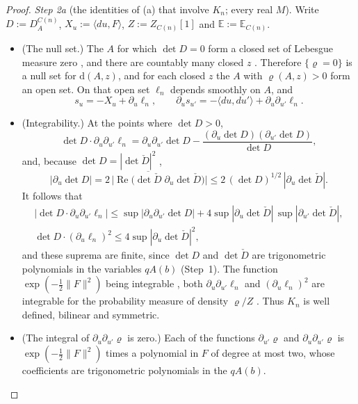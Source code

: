 \documentclass[11pt]{amsart}
\theoremstyle{definition}
\begin{document}
\begin{proof}
\emph{Step 2a} (the identities of (a) that involve $K_n$; every real $M$).
Write $D:=D^{C(n)}_A$, $X_u:=\langle du,F\rangle$, $Z:=Z_{C(n)}[1]$ and $\mathbb E:=\mathbb E_{C(n)}$.
\begin{itemize}
\item[(i)] (The null set.)
The $A$ for which $\det D=0$ form a closed set of Lebesgue measure zero \cite[Theorem~4.25\,(c)]{QEDII}, and there are countably many closed $z$ \cite[Definition~2.6]{QEDII}.
Therefore $\{\varrho=0\}$ is a null set for $\mathrm d(A,z)$, and for each closed $z$ the $A$ with $\varrho(A,z)>0$ form an open set.
On that open set $\ell_n$ depends smoothly on $A$, and
\begin{equation*}
s_u=-X_u+\partial_u\ell_n,\qquad\partial_us_{u'}=-\langle du,du'\rangle+\partial_u\partial_{u'}\ell_n.
\end{equation*}
\item[(ii)] (Integrability.)
At the points where $\det D>0$,
\begin{equation*}
\det D\cdot\partial_u\partial_{u'}\ell_n=\partial_u\partial_{u'}\det D-\frac{(\partial_u\det D)(\partial_{u'}\det D)}{\det D},
\end{equation*}
and, because $\det D=|\det\check D|^2$ \cite[Proposition~3.18\,(d)]{QEDII},
\begin{equation*}
|\partial_u\det D|=2\,\bigl|\operatorname{Re}\bigl(\overline{\det\check D}\;\partial_u\det\check D\bigr)\bigr|\le2\,(\det D)^{1/2}\,|\partial_u\det\check D|.
\end{equation*}
It follows that
\begin{gather*}
|\det D\cdot\partial_u\partial_{u'}\ell_n|\le\sup|\partial_u\partial_{u'}\det D|+4\sup|\partial_u\det\check D|\,\sup|\partial_{u'}\det\check D|,\\
\det D\cdot(\partial_u\ell_n)^2\le4\sup|\partial_u\det\check D|^2,
\end{gather*}
and these suprema are finite, since $\det D$ and $\det\check D$ are trigonometric polynomials in the variables $qA(b)$ (Step~1).
The function $\exp(-\frac12\|F\|^2)$ being integrable \cite[Lemma~3.14]{QEDII}, both $\partial_u\partial_{u'}\ell_n$ and $(\partial_u\ell_n)^2$ are integrable for the probability measure of density $\varrho/Z$ \cite[Definition~2.13]{QEDII}.
Thus $K_n$ is well defined, bilinear and symmetric.
\item[(iii)] (The integral of $\partial_u\partial_{u'}\varrho$ is zero.)
Each of the functions $\partial_{u'}\varrho$ and $\partial_u\partial_{u'}\varrho$ is $\exp(-\frac12\|F\|^2)$ times a polynomial in $F$ of degree at most two, whose coefficients are trigonometric polynomials in the $qA(b)$.

\end{itemize}
\end{proof}
\end{document}
